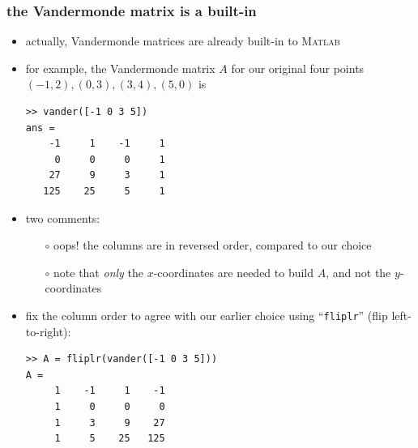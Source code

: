\documentclass[10pt,hyperref]{beamer}
\newcommand{\Matlab}{\textsc{Matlab}\xspace}
\newcommand{\MO}{\Matlab}
\begin{document}
\begin{frame}[fragile]
\frametitle{the Vandermonde matrix is a built-in}

\begin{itemize}
\item actually, Vandermonde matrices are already built-in to \MO
\item for example, the Vandermonde matrix $A$ for our original four points $(-1,2), (0,3), (3,4), (5,0)$ is

\begin{Verbatim}[frame=single,fontfamily=courier,fontsize=\scriptsize]
>> vander([-1 0 3 5])
ans =
    -1     1    -1     1
     0     0     0     1
    27     9     3     1
   125    25     5     1
\end{Verbatim}
\item two comments:
  \begin{itemize}
  \item[$\circ$] oops!  the columns are in reversed order, compared to our choice
  \item[$\circ$] note that \emph{only} the $x$-coordinates are needed to build $A$, and not the $y$-coordinates
  \end{itemize}
\item fix the column order to agree with our earlier choice using ``\texttt{fliplr}'' (flip left-to-right):
\begin{Verbatim}[frame=single,fontfamily=courier,fontsize=\scriptsize]
>> A = fliplr(vander([-1 0 3 5]))
A =
     1    -1     1    -1
     1     0     0     0
     1     3     9    27
     1     5    25   125
\end{Verbatim}
\end{itemize}
\end{frame}
\end{document}
